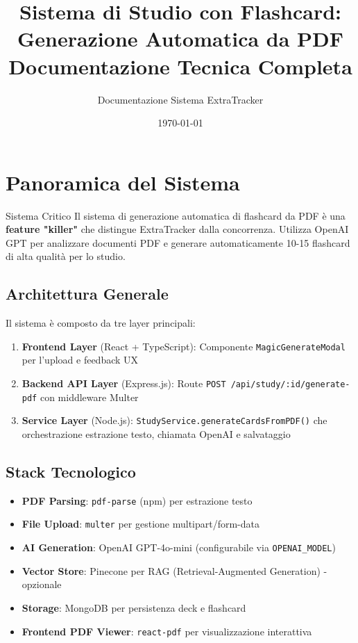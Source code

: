 \documentclass[11pt,a4paper]{article}
\title{\textbf{Sistema di Studio con Flashcard:\\
Generazione Automatica da PDF}\\
\large Documentazione Tecnica Completa}
\author{Documentazione Sistema ExtraTracker}
\date{\today}
\begin{document}
\maketitle
\tableofcontents
\newpage

\section{Panoramica del Sistema}

\begin{importantbox}{Sistema Critico}
Il sistema di generazione automatica di flashcard da PDF è una \textbf{feature "killer"} che distingue ExtraTracker dalla concorrenza. Utilizza OpenAI GPT per analizzare documenti PDF e generare automaticamente 10-15 flashcard di alta qualità per lo studio.
\end{importantbox}

\subsection{Architettura Generale}

Il sistema è composto da tre layer principali:

\begin{enumerate}
    \item \textbf{Frontend Layer} (React + TypeScript): Componente \texttt{MagicGenerateModal} per l'upload e feedback UX
    \item \textbf{Backend API Layer} (Express.js): Route \texttt{POST /api/study/:id/generate-pdf} con middleware Multer
    \item \textbf{Service Layer} (Node.js): \texttt{StudyService.generateCardsFromPDF()} che orchestrazione estrazione testo, chiamata OpenAI e salvataggio
\end{enumerate}

\subsection{Stack Tecnologico}

\begin{itemize}
    \item \textbf{PDF Parsing}: \texttt{pdf-parse} (npm) per estrazione testo
    \item \textbf{File Upload}: \texttt{multer} per gestione multipart/form-data
    \item \textbf{AI Generation}: OpenAI GPT-4o-mini (configurabile via \texttt{OPENAI\_MODEL})
    \item \textbf{Vector Store}: Pinecone per RAG (Retrieval-Augmented Generation) - opzionale
    \item \textbf{Storage}: MongoDB per persistenza deck e flashcard
    \item \textbf{Frontend PDF Viewer}: \texttt{react-pdf} per visualizzazione interattiva
\end{itemize}
\end{document}
